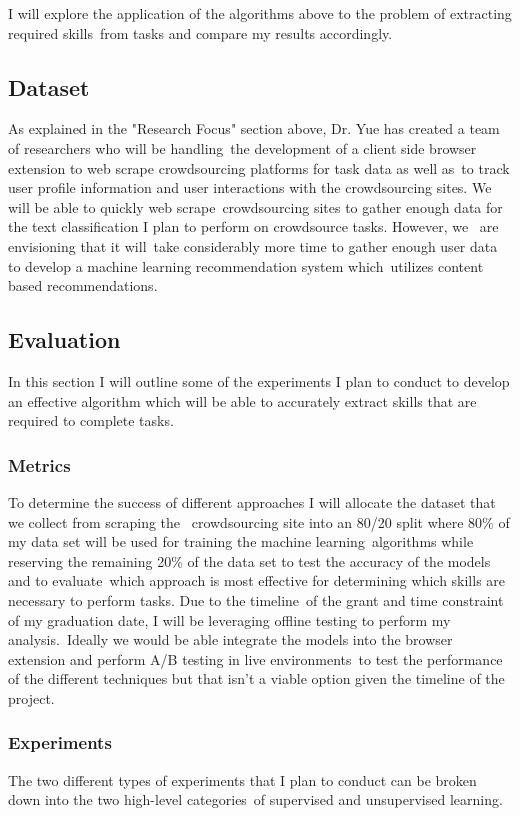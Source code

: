 \documentclass[letterpaper,12pt]{article}
\begin{document}
I will explore the application of the algorithms above to the problem of extracting required skills\
from tasks and compare my results accordingly.
\subsection{Dataset}
As explained in the "Research Focus" section above, Dr. Yue has created a team of researchers who will be handling\
the development of a client side browser extension to web scrape crowdsourcing platforms for task data as well as\
to track user profile information and user interactions with the crowdsourcing sites. We will be able to quickly web scrape\
crowdsourcing sites to gather enough data for the text classification I plan to perform on crowdsource tasks. However, we \
are envisioning that it will\
take considerably more time to gather enough user data to develop a machine learning recommendation system which\
utilizes content based recommendations.

\subsection{Evaluation}
In this section I will outline some of the experiments I plan to conduct to develop an effective algorithm which
will be able to accurately extract skills that are required to complete tasks.

\subsubsection{Metrics}
To determine the success of different approaches I will allocate the dataset that we collect from scraping the \
crowdsourcing site into an 80/20 split where 80\% of my data set will be used for training the machine learning\
algorithms while reserving the remaining 20\% of the data set to test the accuracy of the models and to evaluate\
which approach is most effective for determining which skills are necessary to perform tasks. Due to the timeline\
of the grant and time constraint of my graduation date, I will be leveraging offline testing to perform my analysis.\
Ideally we would be able integrate the models into the browser extension and perform A/B testing in live environments\
to test the performance of the different techniques but that isn't a viable option given the timeline of the project.
\subsubsection{Experiments}
The two different types of experiments that I plan to conduct can be broken down into the two high-level categories\
of supervised and unsupervised learning.
\end{document}
